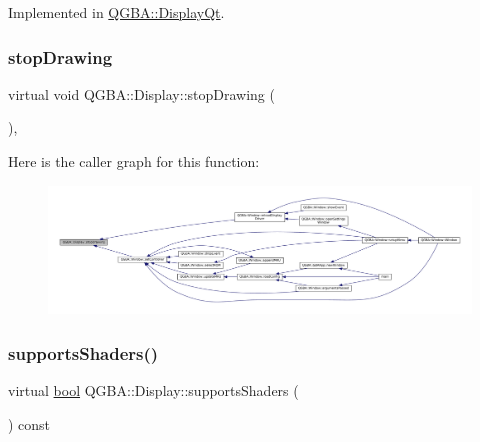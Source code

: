Implemented in \mbox{\hyperlink{class_q_g_b_a_1_1_display_qt_adb1dd8630e91d7eb189ea4626fc80465}{Q\+G\+B\+A\+::\+Display\+Qt}}.

\mbox{\label{class_q_g_b_a_1_1_display_ad6176432272b711781318a371bfe1017}} 
\subsubsection{\texorpdfstring{stop\+Drawing}{stopDrawing}}
{\footnotesize\ttfamily virtual void Q\+G\+B\+A\+::\+Display\+::stop\+Drawing (\begin{DoxyParamCaption}{ }\end{DoxyParamCaption})\hspace{0.3cm}{\ttfamily [pure virtual]}, {\ttfamily [slot]}}

Here is the caller graph for this function\+:
\nopagebreak
\begin{figure}[H]
\begin{center}
\leavevmode
\includegraphics[width=350pt]{class_q_g_b_a_1_1_display_ad6176432272b711781318a371bfe1017_icgraph}
\end{center}
\end{figure}
\mbox{\label{class_q_g_b_a_1_1_display_a25a97e9613c47c57a0b436d33c10380f}} 
\subsubsection{\texorpdfstring{supports\+Shaders()}{supportsShaders()}}
{\footnotesize\ttfamily virtual \mbox{\hyperlink{libretro_8h_a4a26dcae73fb7e1528214a068aca317e}{bool}} Q\+G\+B\+A\+::\+Display\+::supports\+Shaders (\begin{DoxyParamCaption}{ }\end{DoxyParamCaption}) const\hspace{0.3cm}{\ttfamily [pure virtual]}}



